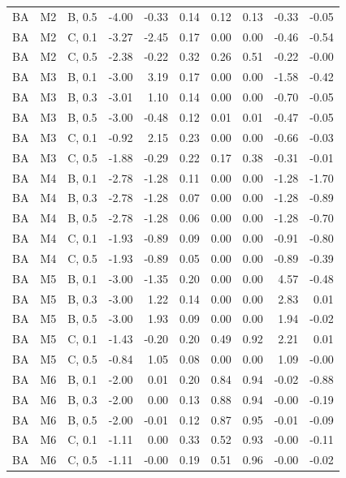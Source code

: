 \begin{longtable}{lllrrrrrrr}
BA & M2 & B, 0.5 & -4.00 & -0.33 & 0.14 & 0.12 & 0.13 & -0.33 & -0.05 \\
BA & M2 & C, 0.1 & -3.27 & -2.45 & 0.17 & 0.00 & 0.00 & -0.46 & -0.54 \\
BA & M2 & C, 0.5 & -2.38 & -0.22 & 0.32 & 0.26 & 0.51 & -0.22 & -0.00 \\
BA & M3 & B, 0.1 & -3.00 & 3.19 & 0.17 & 0.00 & 0.00 & -1.58 & -0.42 \\
BA & M3 & B, 0.3 & -3.01 & 1.10 & 0.14 & 0.00 & 0.00 & -0.70 & -0.05 \\
BA & M3 & B, 0.5 & -3.00 & -0.48 & 0.12 & 0.01 & 0.01 & -0.47 & -0.05 \\
BA & M3 & C, 0.1 & -0.92 & 2.15 & 0.23 & 0.00 & 0.00 & -0.66 & -0.03 \\
BA & M3 & C, 0.5 & -1.88 & -0.29 & 0.22 & 0.17 & 0.38 & -0.31 & -0.01 \\
BA & M4 & B, 0.1 & -2.78 & -1.28 & 0.11 & 0.00 & 0.00 & -1.28 & -1.70 \\
BA & M4 & B, 0.3 & -2.78 & -1.28 & 0.07 & 0.00 & 0.00 & -1.28 & -0.89 \\
BA & M4 & B, 0.5 & -2.78 & -1.28 & 0.06 & 0.00 & 0.00 & -1.28 & -0.70 \\
BA & M4 & C, 0.1 & -1.93 & -0.89 & 0.09 & 0.00 & 0.00 & -0.91 & -0.80 \\
BA & M4 & C, 0.5 & -1.93 & -0.89 & 0.05 & 0.00 & 0.00 & -0.89 & -0.39 \\
BA & M5 & B, 0.1 & -3.00 & -1.35 & 0.20 & 0.00 & 0.00 & 4.57 & -0.48 \\
BA & M5 & B, 0.3 & -3.00 & 1.22 & 0.14 & 0.00 & 0.00 & 2.83 & 0.01 \\
BA & M5 & B, 0.5 & -3.00 & 1.93 & 0.09 & 0.00 & 0.00 & 1.94 & -0.02 \\
BA & M5 & C, 0.1 & -1.43 & -0.20 & 0.20 & 0.49 & 0.92 & 2.21 & 0.01 \\
BA & M5 & C, 0.5 & -0.84 & 1.05 & 0.08 & 0.00 & 0.00 & 1.09 & -0.00 \\
BA & M6 & B, 0.1 & -2.00 & 0.01 & 0.20 & 0.84 & 0.94 & -0.02 & -0.88 \\
BA & M6 & B, 0.3 & -2.00 & 0.00 & 0.13 & 0.88 & 0.94 & -0.00 & -0.19 \\
BA & M6 & B, 0.5 & -2.00 & -0.01 & 0.12 & 0.87 & 0.95 & -0.01 & -0.09 \\
BA & M6 & C, 0.1 & -1.11 & 0.00 & 0.33 & 0.52 & 0.93 & -0.00 & -0.11 \\
BA & M6 & C, 0.5 & -1.11 & -0.00 & 0.19 & 0.51 & 0.96 & -0.00 & -0.02 \\
\end{longtable}
